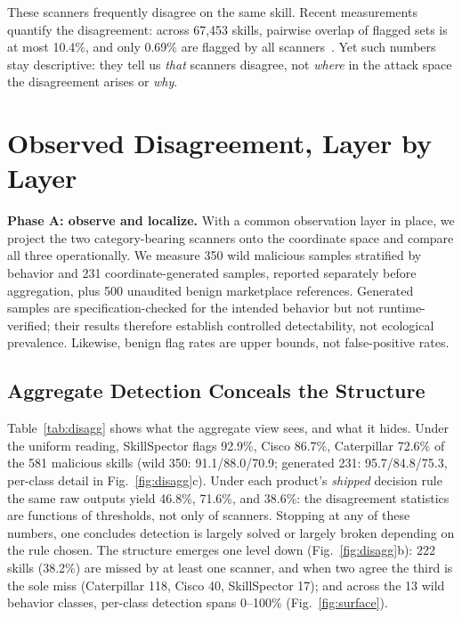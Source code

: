 \documentclass[sigconf,nonacm]{acmart}
\begin{document}
These scanners frequently disagree on the same skill. Recent measurements quantify the disagreement: across 67{,}453 skills, pairwise overlap of flagged sets is at most 10.4\%, and only 0.69\% are flagged by all scanners~\cite{clawhub2026}. Yet such numbers stay descriptive: they tell us \emph{that} scanners disagree, not \emph{where} in the attack space the disagreement arises or \emph{why}.

\section{Observed Disagreement, Layer by Layer}
\label{sec:explain}

\noindent\textbf{Phase A: observe and localize.} With a common observation layer in place, we project the two category-bearing scanners onto the coordinate space and compare all three operationally. We measure 350 wild malicious samples stratified by behavior and 231 coordinate-generated samples, reported separately before aggregation, plus 500 unaudited benign marketplace references. Generated samples are specification-checked for the intended behavior but not runtime-verified; their results therefore establish controlled detectability, not ecological prevalence. Likewise, benign flag rates are upper bounds, not false-positive rates.

\subsection{Aggregate Detection Conceals the Structure}
Table~\ref{tab:disagg} shows what the aggregate view sees, and what it hides. Under the uniform reading, SkillSpector flags 92.9\%, Cisco 86.7\%, Caterpillar 72.6\% of the 581 malicious skills (wild 350: 91.1/88.0/70.9; generated 231: 95.7/84.8/75.3, per-class detail in Fig.~\ref{fig:disagg}c). Under each product's \emph{shipped} decision rule the same raw outputs yield 46.8\%, 71.6\%, and 38.6\%: the disagreement statistics are functions of thresholds, not only of scanners. Stopping at any of these numbers, one concludes detection is largely solved or largely broken depending on the rule chosen. The structure emerges one level down (Fig.~\ref{fig:disagg}b): 222 skills (38.2\%) are missed by at least one scanner, and when two agree the third is the sole miss (Caterpillar 118, Cisco 40, SkillSpector 17); and across the 13 wild behavior classes, per-class detection spans 0--100\% (Fig.~\ref{fig:surface}).
\end{document}
